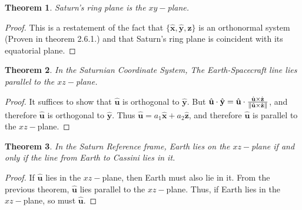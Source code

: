 \documentclass{article}
\theoremstyle{mystyle}
\newtheorem{theorem}{Theorem}[section]
\begin{document}
\begin{theorem}
Saturn's ring plane is the $xy-$plane.
\end{theorem}
\begin{proof}
This is a restatement of the fact that $\{\hat{\mathbf{x}},\hat{\mathbf{y}},\hat{\mathbf{z}}\}$ is an orthonormal system (Proven in theorem 2.6.1.) and that Saturn's ring plane is coincident with its equatorial plane. 
\end{proof}

\begin{theorem}
In the Saturnian Coordinate System, The Earth-Spacecraft line lies parallel to the $xz-$plane.
\end{theorem}
\begin{proof}
It suffices to show that $\hat{\mathbf{u}}$ is orthogonal to $\hat{\mathbf{y}}$. But $\hat{\mathbf{u}}\cdot \hat{\mathbf{y}} = \hat{\mathbf{u}}\cdot \frac{\hat{\mathbf{u}}\times \hat{\mathbf{z}}}{\norm{\hat{\mathbf{u}}\times \hat{\mathbf{z}}}}$, and therefore $\hat{\mathbf{u}}$ is orthogonal to $\hat{\mathbf{y}}$. Thus $\hat{\mathbf{u}} = a_1\hat{\mathbf{x}} + a_2\hat{\mathbf{z}}$, and therefore $\hat{\mathbf{u}}$ is parallel to the $xz-$plane.
\end{proof}

\begin{theorem}
In the Saturn Reference frame, Earth lies on the $xz-$plane if and only if the line from Earth to Cassini lies in it.
\end{theorem}
\begin{proof}
If $\hat{\mathbf{u}}$ lies in the $xz-$plane, then Earth must also lie in it. From the previous theorem, $\hat{\mathbf{u}}$ lies parallel to the $xz-$plane. Thus, if Earth lies in the $xz-$plane, so must $\hat{\mathbf{u}}$.
\end{proof}
\end{document}
